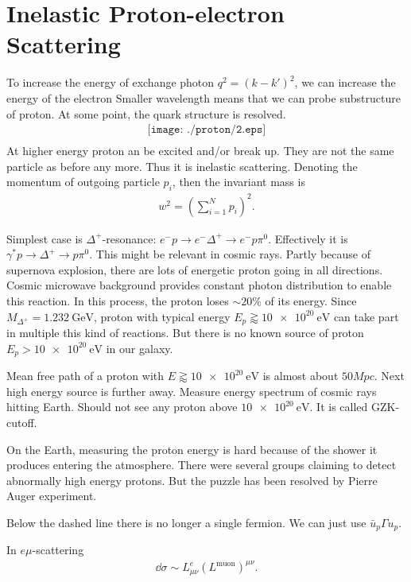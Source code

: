 \section{Inelastic Proton-electron Scattering}
To increase the energy of exchange photon $q^2 = (k - k')^2$, we can increase the energy of the electron
Smaller wavelength means that we can probe substructure of proton. At some point, the quark structure is resolved.
\begin{align*}
   \texttt{[image: ./proton/2.eps]}\\
\end{align*}
At higher energy proton an be excited and/or break up. They are not the same particle as before any more. Thus it is inelastic scattering. 
Denoting the momentum of outgoing particle $p_i$, then the invariant mass is
\begin{align*}
   w^2 = \left( \sum_{i=1}^{N} p_i \right)^2.
\end{align*}

Simplest case is $\Delta^+$-resonance: $e^- p \rightarrow e^- \Delta^+ \rightarrow e^- p \pi^0$. Effectively it is $\gamma^* p \rightarrow \Delta^+ \rightarrow p \pi^0$. This might be relevant in cosmic rays. Partly because of supernova explosion, there are lots of energetic proton going in all directions. Cosmic microwave background provides constant photon distribution to enable this reaction. In this process, the proton loses $\sim 20 \%$ of its energy. Since $M_{\Delta^+} = \SI{1.232}{\giga \eV}$, proton with typical energy $E_p \gtrapprox \SI{10e20}{\eV}$ can take part in multiple this kind of reactions. But there is no known source of proton $E_p > \SI{10e20}{\eV}$ in our galaxy.

Mean free path of a proton with $E \gtrapprox \SI{10e20}{\eV}$ is almost about $50 Mpc$. Next high energy source is further away. Measure energy spectrum of cosmic rays hitting Earth. Should not see any proton above $\SI{10e20}{\eV}$. It is called GZK-cutoff. 

On the Earth, measuring the proton energy is hard because of the shower it produces entering the atmosphere.
There were several groups claiming to detect abnormally high energy protons. But the puzzle has been resolved by Pierre Auger experiment.

Below the dashed line there is no longer a single fermion. We can just use $\bar{u}_p \Gamma u_p$.

In $e\mu$-scattering
\begin{align*}
   \dd{\sigma} \sim L_{\mu\nu}^e \left( L^\text{muon} \right)^{\mu\nu}.
\end{align*}

